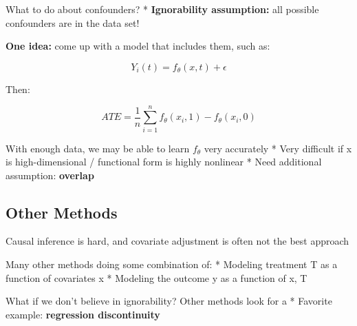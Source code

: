 \documentclass[
  letterpaper,
  DIV=11,
  numbers=noendperiod]{scrreprt}
\begin{document}
What to do about confounders? * \textbf{Ignorability assumption:} all
possible confounders are in the data set!

\textbf{One idea:} come up with a model that includes them, such as:

\[Y_{i}(t) = f_{\theta}(x, t) + \epsilon \]

Then:

\[ATE = \frac{1}{n}\sum_{i=1}^{n}{f_{\theta}(x_i, 1) - f_{\theta}(x_i, 0)}\]

With enough data, we may be able to learn \(f_{\theta}\) very accurately
* Very difficult if x is high-dimensional / functional form is highly
nonlinear * Need additional assumption: \textbf{overlap}

\hypertarget{other-methods}{%
\subsection{Other Methods}\label{other-methods}}

Causal inference is hard, and covariate adjustment is often not the best
approach

Many other methods doing some combination of: * Modeling treatment T as
a function of covariates x * Modeling the outcome y as a function of x,
T

What if we don't believe in ignorability? Other methods look for a *
Favorite example: \textbf{regression discontinuity}
\end{document}
